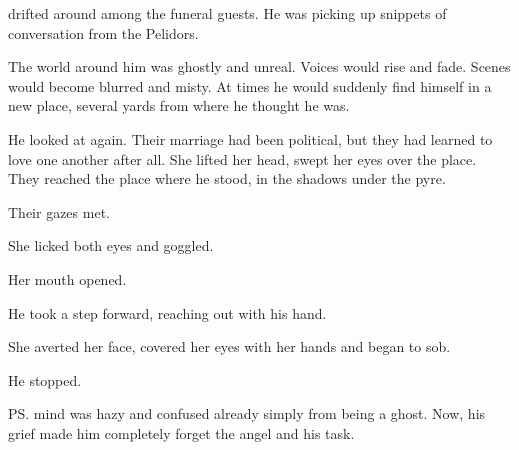 \Icor{} drifted around among the funeral guests. 
He was picking up snippets of conversation from the Pelidors. 

The world around him was ghostly and unreal. 
Voices would rise and fade. 
Scenes would become blurred and misty. 
At times he would suddenly find himself in a new place, several yards from where he thought he was. 


He looked at \Tiroco{} again. 
Their marriage had been political, but they had learned to love one another after all. 
She lifted her head, swept her eyes over the place. 
They reached the place where he stood, in the shadows under the pyre. 

Their gazes met. 

She licked both eyes and goggled.

Her mouth opened. 

He took a step forward, reaching out with his hand. 
\tho{\Tiroco!}

She averted her face, covered her eyes with her hands and began to sob. 

He stopped. 

\ps{\Icor}{} mind was hazy and confused already simply from being a ghost. 
Now, his grief made him completely forget the angel and his task. 

